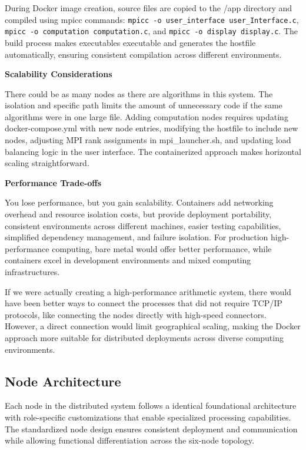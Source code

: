 \documentclass{article}
\begin{document}
During Docker image creation, source files are copied to the /app directory and compiled using mpicc commands: \texttt{mpicc -o user\_interface user\_Interface.c}, \texttt{mpicc -o computation computation.c}, and \texttt{mpicc -o display display.c}. The build process makes executables executable and generates the hostfile automatically, ensuring consistent compilation across different environments.

\textbf{Scalability Considerations}

There could be as many nodes as there are algorithms in this system. The isolation and specific path limits the amount of unnecessary code if the same algorithms were in one large file. Adding computation nodes requires updating docker-compose.yml with new node entries, modifying the hostfile to include new nodes, adjusting MPI rank assignments in mpi\_launcher.sh, and updating load balancing logic in the user interface. The containerized approach makes horizontal scaling straightforward.

\textbf{Performance Trade-offs}

You lose performance, but you gain scalability. Containers add networking overhead and resource isolation costs, but provide deployment portability, consistent environments across different machines, easier testing capabilities, simplified dependency management, and failure isolation. For production high-performance computing, bare metal would offer better performance, while containers excel in development environments and mixed computing infrastructures.

If we were actually creating a high-performance arithmetic system, there would have been better ways to connect the processes that did not require TCP/IP protocols, like connecting the nodes directly with high-speed connectors. However, a direct connection would limit geographical scaling, making the Docker approach more suitable for distributed deployments across diverse computing environments.


\subsection{Node Architecture}
Each node in the distributed system follows a identical foundational architecture with role-specific customizations that enable specialized processing capabilities. The standardized node design ensures consistent deployment and communication while allowing functional differentiation across the six-node topology.
\end{document}
